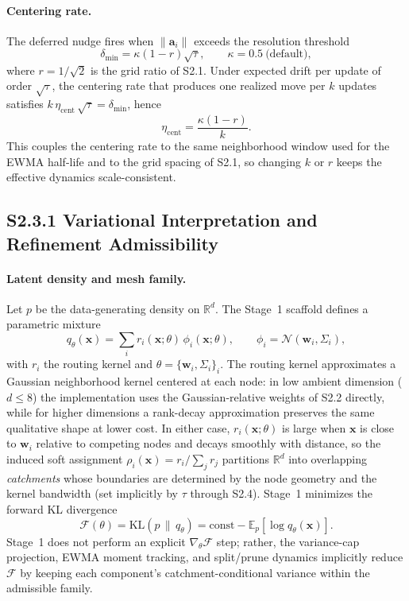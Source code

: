 \documentclass[11pt]{article}
\begin{document}
\paragraph{Centering rate.}
The deferred nudge fires when $\|\mathbf a_i\|$ exceeds the resolution threshold
\[
\delta_{\min}=\kappa(1-r)\sqrt{\tau},
\qquad \kappa=0.5\ \text{(default)},
\]
where $r=1/\sqrt{2}$ is the grid ratio of S2.1. Under expected drift per update of order $\sqrt{\tau}$, the centering rate that produces one realized move per $k$ updates satisfies $k\,\eta_{\mathrm{cent}}\,\sqrt{\tau}=\delta_{\min}$, hence
\[
\eta_{\mathrm{cent}}=\frac{\kappa(1-r)}{k}.
\]
This couples the centering rate to the same neighborhood window used for the EWMA half-life and to the grid spacing of S2.1, so changing $k$ or $r$ keeps the effective dynamics scale-consistent.

\subsection*{S2.3.1 Variational Interpretation and Refinement Admissibility}
\label{sec:si-variational-interpretation}

\paragraph{Latent density and mesh family.}
Let $p$ be the data-generating density on $\mathbb R^d$. The Stage~1 scaffold defines a parametric mixture
\[
q_\theta(\mathbf x)
=\sum_i r_i(\mathbf x;\theta)\,\phi_i(\mathbf x;\theta),
\qquad
\phi_i=\mathcal N(\mathbf w_i,\Sigma_i),
\]
with $r_i$ the routing kernel and $\theta=\{\mathbf w_i,\Sigma_i\}_i$. The routing kernel approximates a Gaussian neighborhood kernel centered at each node: in low ambient dimension ($d\le8$) the implementation uses the Gaussian-relative weights of S2.2 directly, while for higher dimensions a rank-decay approximation preserves the same qualitative shape at lower cost. In either case, $r_i(\mathbf x;\theta)$ is large when $\mathbf x$ is close to $\mathbf w_i$ relative to competing nodes and decays smoothly with distance, so the induced soft assignment $\rho_i(\mathbf x)=r_i/\sum_j r_j$ partitions $\mathbb R^d$ into overlapping \emph{catchments} whose boundaries are determined by the node geometry and the kernel bandwidth (set implicitly by $\tau$ through S2.4). Stage~1 minimizes the forward KL divergence
\[
\mathcal F(\theta)
=\mathrm{KL}(p\,\|\,q_\theta)
=\mathrm{const}-\mathbb E_p[\log q_\theta(\mathbf x)].
\]
Stage~1 does not perform an explicit $\nabla_\theta\mathcal F$ step; rather, the variance-cap projection, EWMA moment tracking, and split/prune dynamics implicitly reduce $\mathcal F$ by keeping each component's catchment-conditional variance within the admissible family.
\end{document}
